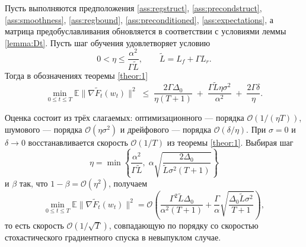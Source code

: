 \begin{theorem}
    \label{theor:3}
    Пусть выполняются предположения \ref{ass:regstruct}, \ref{ass:precondstruct}, \ref{ass:smoothness}, \ref{ass:regbound}, \ref{ass:preconditioned}, \ref{ass:expectations}, а матрица предобуславливания обновляется в соответствии с условиями леммы \ref{lemma:Dt}. Пусть шаг обучения удовлетворяет условию
    \begin{equation*}
        0 < \eta \le \frac{\alpha^2}{\Gamma \widetilde{L}}, \qquad \widetilde{L} = L_f + \Gamma L_r.
    \end{equation*}
    Тогда в обозначениях теоремы \ref{theor:1}
    \begin{equation*}
        \min_{0 \le t \le T} \mathbb{E}\|\nabla \widetilde{F}_t (w_t) \|^2 \;\le\; \frac{2\Gamma\Delta_0}{\eta (T+1)} \;+\; \frac{\Gamma \widetilde{L} \eta \sigma^2}{\alpha^2} \;+\; \frac{2\Gamma\delta}{\eta}.
    \end{equation*}
\end{theorem}

\begin{note}
Оценка состоит из трёх слагаемых: оптимизационного --- порядка $\mathcal{O}(1/(\eta T))$, шумового --- порядка $\mathcal{O}(\eta\sigma^2)$ и дрейфового --- порядка $\mathcal{O}(\delta/\eta)$. При $\sigma = 0$ и $\delta \to 0$ восстанавливается скорость $\mathcal{O}(1/T)$ из теоремы \ref{theor:1}. Выбирая шаг
\begin{equation*}
\eta = \min\left\{ \frac{\alpha^2}{\Gamma\widetilde{L}},\; \alpha\sqrt{\frac{2\Delta_0}{\widetilde{L}\sigma^2 (T+1)}} \right\}
\end{equation*}
и $\beta$ так, что $1 - \beta = \mathcal{O}(\eta^2)$, получаем
\begin{equation*}
    \min_{0 \le t \le T} \mathbb{E}\|\nabla \widetilde{F}_t (w_t) \|^2 = \mathcal{O}\left( \frac{\Gamma^2 \widetilde{L} \Delta_0}{\alpha^2 (T+1)} + \frac{\Gamma}{\alpha}\sqrt{\frac{\Delta_0 \widetilde{L} \sigma^2}{T+1}} \right),
\end{equation*}
то есть скорость $\mathcal{O}(1/\sqrt{T})$, совпадающую по порядку со скоростью стохастического градиентного спуска в невыпуклом случае.
\end{note}

